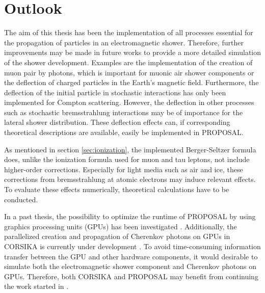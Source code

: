 \section{Outlook}

The aim of this thesis has been the implementation of all processes essential for the propagation of particles in an electromagnetic shower.
Therefore, further improvements may be made in future works to provide a more detailed simulation of the shower development.
Examples are the implementation of the creation of muon pair by photons, which is important for muonic air shower components \cite{corsika_physics} or the deflection of charged particles in the Earth's magnetic field.
Furthermore, the deflection of the initial particle in stochastic interactions has only been implemented for Compton scattering.
However, the deflection in other processes such as stochastic bremsstrahlung interactions may be of importance for the lateral shower distribution.
These deflection effects can, if corresponding theoretical descriptions are available, easily be implemented in PROPOSAL.

As mentioned in section \ref{sec:ionization}, the implemented Berger-Seltzer formula does, unlike the ionization formula used for muon and tau leptons, not include higher-order corrections.
Especially for light media such as air and ice, these corrections from bremsstrahlung at atomic electrons may induce relevant effects.
To evaluate these effects numerically, theoretical calculations have to be conducted.

In a past thesis, the possibility to optimize the runtime of PROPOSAL by using graphics processing units (GPUs) has been investigated \cite{tomasz}.
Additionally, the parallelized creation and propagation of Cherenkov photons on GPUs in CORSIKA is currently under development \cite{baack}.
To avoid time-consuming information transfer between the GPU and other hardware components, it would desirable to simulate both the electromagnetic shower component and Cherenkov photons on GPUs.
Therefore, both CORSIKA and PROPOSAL may benefit from continuing the work started in \cite{tomasz}.

